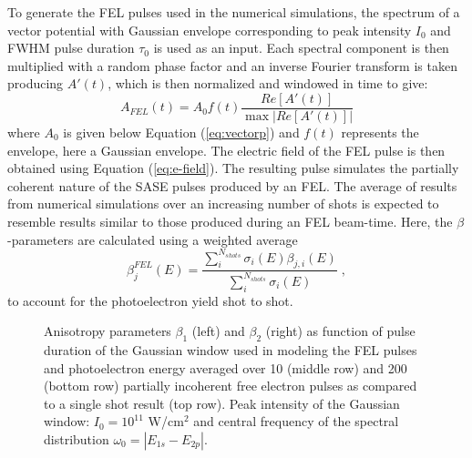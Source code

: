 To generate the FEL pulses used in the numerical simulations, the spectrum of a vector potential with Gaussian envelope corresponding to peak intensity $I_0$ and FWHM pulse duration $\tau_0$ is used as an input. Each spectral component is then multiplied with a random phase factor and an inverse Fourier transform is taken producing $A'(t)$, which is then normalized and windowed in time to give:
\begin{equation}
    A_{FEL}(t) = A_0 f(t)\frac{Re\left[A'(t)\right]}{\max|Re\left[A'(t)\right]|}
\end{equation}
where $A_0$ is given below Equation (\ref{eq:vectorp}) and $f(t)$ represents the envelope, here a Gaussian envelope. The electric field of the FEL pulse is then obtained using Equation (\ref{eq:e-field}). The resulting pulse simulates the partially coherent nature of the SASE pulses produced by an FEL. 
The average of results from numerical simulations over an increasing number of shots is expected to resemble results similar to those produced during an FEL beam-time. Here, the $\beta$-parameters are calculated using a weighted average
% 
\begin{equation}
\beta_j^{FEL}(E) 
= 
\frac{\sum_i^{N_{shots}}  \sigma_i(E) \beta_{j,i}(E)}
{\sum_i^{N_{shots}}\sigma_i(E)}\; ,
    \label{eq:FEL_beta}
\end{equation}
% 
to account for the photoelectron yield shot to shot.

\begin{figure}[t]
\centering
\caption{
Anisotropy parameters $\beta_1$ (left) and $\beta_2$ (right) as function of pulse duration of the Gaussian window used in modeling the FEL pulses and photoelectron energy averaged over 10 (middle row) and 200 (bottom row) partially incoherent free electron pulses as compared to a single shot result (top row). Peak intensity of the Gaussian window: $I_{0} = 10^{11}$ W/cm$^2$ 
and central frequency of the spectral distribution $\omega_0 = |E_{1s}-E_{2p}|$. 
} 
  \label{fig:beta-variation-FEL}
\end{figure}

